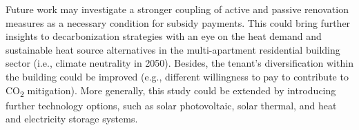 Future work may investigate a stronger coupling of active and passive renovation measures as a necessary condition for subsidy payments. This could bring further insights to decarbonization strategies with an eye on the heat demand and sustainable heat source alternatives in the multi-apartment residential building sector (i.e., climate neutrality in 2050). Besides, the tenant's diversification within the building could be improved (e.g., different willingness to pay to contribute to CO\textsubscript{2} mitigation). More generally, this study could be extended by introducing further technology options, such as solar photovoltaic, solar thermal, and heat and electricity storage systems. 